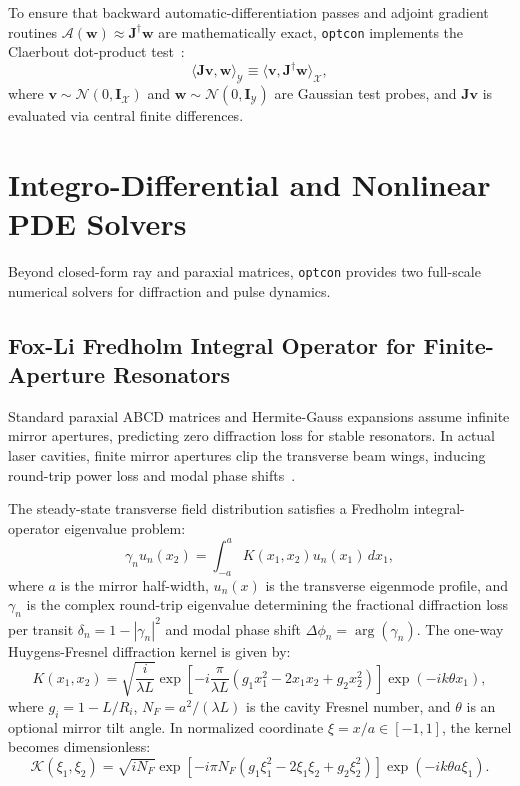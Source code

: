 \documentclass[preprint,12pt]{elsarticle}
\begin{document}
To ensure that backward automatic-differentiation passes and adjoint gradient routines $\mathcal{A}(\mathbf{w}) \approx \mathbf{J}^\dagger \mathbf{w}$ are mathematically exact, \texttt{optcon} implements the Claerbout dot-product test~\cite{Claerbout1992}:
\begin{equation}
\langle \mathbf{J}\mathbf{v}, \mathbf{w} \rangle_{\mathcal{Y}} \equiv \langle \mathbf{v}, \mathbf{J}^\dagger \mathbf{w} \rangle_{\mathcal{X}},
\end{equation}
where $\mathbf{v} \sim \mathcal{N}(0, \mathbf{I}_{\mathcal{X}})$ and $\mathbf{w} \sim \mathcal{N}(0, \mathbf{I}_{\mathcal{Y}})$ are Gaussian test probes, and $\mathbf{J}\mathbf{v}$ is evaluated via central finite differences.

\section{Integro-Differential and Nonlinear PDE Solvers}
\label{sec:solvers}

Beyond closed-form ray and paraxial matrices, \texttt{optcon} provides two full-scale numerical solvers for diffraction and pulse dynamics.

\subsection{Fox-Li Fredholm Integral Operator for Finite-Aperture Resonators}

Standard paraxial ABCD matrices and Hermite-Gauss expansions assume infinite mirror apertures, predicting zero diffraction loss for stable resonators. In actual laser cavities, finite mirror apertures clip the transverse beam wings, inducing round-trip power loss and modal phase shifts~\cite{FoxLi1961,Siegman1986}.

The steady-state transverse field distribution satisfies a Fredholm integral-operator eigenvalue problem:
\begin{equation}
\gamma_n u_n(x_2) = \int_{-a}^{a} K(x_1, x_2) u_n(x_1) \, dx_1,
\label{eq:fox_li}
\end{equation}
where $a$ is the mirror half-width, $u_n(x)$ is the transverse eigenmode profile, and $\gamma_n$ is the complex round-trip eigenvalue determining the fractional diffraction loss per transit $\delta_n = 1 - |\gamma_n|^2$ and modal phase shift $\Delta\phi_n = \arg(\gamma_n)$. The one-way Huygens-Fresnel diffraction kernel is given by:
\begin{equation}
K(x_1, x_2) = \sqrt{\frac{i}{\lambda L}} \exp\left[ -i \frac{\pi}{\lambda L} \left( g_1 x_1^2 - 2 x_1 x_2 + g_2 x_2^2 \right) \right] \exp(-i k \theta x_1),
\end{equation}
where $g_i = 1 - L/R_i$, $N_F = a^2 / (\lambda L)$ is the cavity Fresnel number, and $\theta$ is an optional mirror tilt angle. In normalized coordinate $\xi = x/a \in [-1, 1]$, the kernel becomes dimensionless:
\begin{equation}
\mathcal{K}(\xi_1, \xi_2) = \sqrt{i N_F} \exp\left[ -i \pi N_F \left( g_1 \xi_1^2 - 2 \xi_1 \xi_2 + g_2 \xi_2^2 \right) \right] \exp(-i k \theta a \xi_1).
\end{equation}
\end{document}
